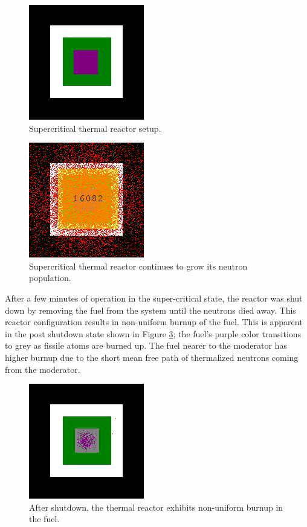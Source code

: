 \documentclass{anstrans}
\begin{document}
\begin{figure}
    \centering
    \includegraphics{reactor-thermal-setup.png}
    \caption{Supercritical thermal reactor setup.}
    \label{fig:thermal-setup}
\end{figure}

\begin{figure}
    \centering
    \includegraphics{reactor-thermal-1min.png}
    \caption{Supercritical thermal reactor continues to grow its neutron population. }
    \label{fig:thermal-on}
\end{figure}

After a few minutes of operation in the super-critical state, the reactor was
shut down by removing the fuel from the system until the neutrons died away.
This reactor configuration results in non-uniform burnup of the fuel. This is
apparent in the post shutdown state shown in Figure \ref{fig:thermal-after};
the fuel's purple color transitions to grey as fissile atoms are burned up.
The fuel nearer to the moderator has higher burnup due to the short mean free
path of thermalized neutrons coming from the moderator.

\begin{figure}
    \centering
    \includegraphics{reactor-thermal-after.png}
    \caption{After shutdown, the thermal reactor exhibits non-uniform burnup in the fuel. }
    \label{fig:thermal-after}
\end{figure}
\end{document}
